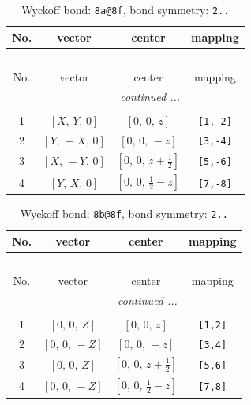 \documentclass[fleqn,8pt]{jsarticle}
\begin{document}
\begin{longtable}{cccc}
\caption{Wyckoff bond: {\tt 8a@8f}, bond symmetry: {\tt 2..}}
 \\
 \hline \hline
No. & vector & center & mapping \\ \hline \endfirsthead

\multicolumn{3}{l}{\tablename\ \thetable{}} \\
 \hline \hline
No. & vector & center & mapping \\ \hline \endhead

 \hline \hline
\multicolumn{3}{r}{\footnotesize\it continued ...} \\ \endfoot

 \hline \hline
\multicolumn{3}{r}{} \\ \endlastfoot

1 & $\left[ X,\, Y,\, 0 \right]$ & $\left[ 0,\, 0,\, z \right]$ & {\tt [1,-2]} \\ \hline
2 & $\left[ Y,\, - X,\, 0 \right]$ & $\left[ 0,\, 0,\, - z \right]$ & {\tt [3,-4]} \\ \hline
3 & $\left[ X,\, - Y,\, 0 \right]$ & $\left[ 0,\, 0,\, z + \frac{1}{2} \right]$ & {\tt [5,-6]} \\ \hline
4 & $\left[ Y,\, X,\, 0 \right]$ & $\left[ 0,\, 0,\, \frac{1}{2} - z \right]$ & {\tt [7,-8]} \\
\end{longtable}
\renewcommand{\arraystretch}{1.2}
\begin{longtable}{cccc}
\caption{Wyckoff bond: {\tt 8b@8f}, bond symmetry: {\tt 2..}}
 \\
 \hline \hline
No. & vector & center & mapping \\ \hline \endfirsthead

\multicolumn{3}{l}{\tablename\ \thetable{}} \\
 \hline \hline
No. & vector & center & mapping \\ \hline \endhead

 \hline \hline
\multicolumn{3}{r}{\footnotesize\it continued ...} \\ \endfoot

 \hline \hline
\multicolumn{3}{r}{} \\ \endlastfoot

1 & $\left[ 0,\, 0,\, Z \right]$ & $\left[ 0,\, 0,\, z \right]$ & {\tt [1,2]} \\ \hline
2 & $\left[ 0,\, 0,\, - Z \right]$ & $\left[ 0,\, 0,\, - z \right]$ & {\tt [3,4]} \\ \hline
3 & $\left[ 0,\, 0,\, Z \right]$ & $\left[ 0,\, 0,\, z + \frac{1}{2} \right]$ & {\tt [5,6]} \\ \hline
4 & $\left[ 0,\, 0,\, - Z \right]$ & $\left[ 0,\, 0,\, \frac{1}{2} - z \right]$ & {\tt [7,8]} \\
\end{longtable}
\end{document}
